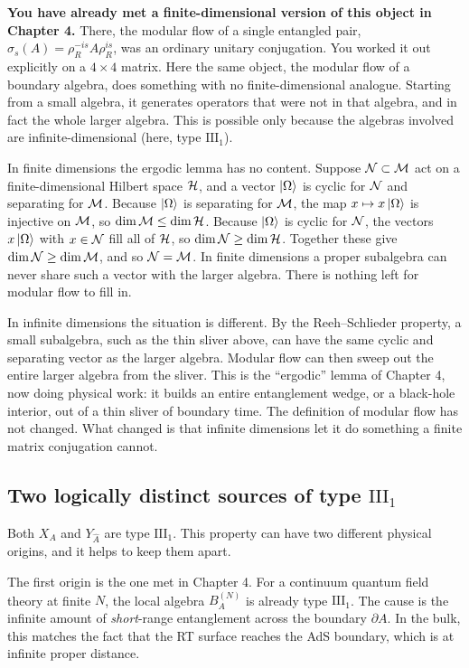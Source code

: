 \begin{physconnect}
\textbf{You have already met a finite-dimensional version of this object in Chapter 4.} There, the modular
flow of a single entangled pair, $\sigma_s(A)=\rho_R^{-is}A\rho_R^{is}$, was an ordinary unitary conjugation.
You worked it out explicitly on a $4\times4$ matrix. Here the same object, the modular flow of a boundary
algebra, does something with no finite-dimensional analogue. Starting from a small algebra, it generates
operators that were not in that algebra, and in fact the whole larger algebra. This is possible only because
the algebras involved are infinite-dimensional (here, type $\mathrm{III}_1$).

In finite dimensions the ergodic lemma has no content. Suppose $\mathcal{N}\subset\mathcal{M}$ act on a finite-dimensional
Hilbert space $\mathcal{H}$, and a vector $\ket\Omega$ is cyclic for $\mathcal{N}$ and separating for $\mathcal{M}$. Because
$\ket\Omega$ is separating for $\mathcal{M}$, the map $x\mapsto x\ket\Omega$ is injective on $\mathcal{M}$, so
$\dim\mathcal{M}\le\dim\mathcal{H}$. Because $\ket\Omega$ is cyclic for $\mathcal{N}$, the vectors $x\ket\Omega$ with $x\in\mathcal{N}$ fill all
of $\mathcal{H}$, so $\dim\mathcal{N}\ge\dim\mathcal{H}$. Together these give $\dim\mathcal{N}\ge\dim\mathcal{M}$, and so $\mathcal{N}=\mathcal{M}$. In finite dimensions
a proper subalgebra can never share such a vector with the larger algebra. There is nothing left for
modular flow to fill in.

In infinite dimensions the situation is different. By the Reeh--Schlieder property, a small subalgebra, such
as the thin sliver above, can have the same cyclic and separating vector as the larger algebra. Modular flow
can then sweep out the entire larger algebra from the sliver. This is the ``ergodic'' lemma of Chapter 4, now
doing physical work: it builds an entire entanglement wedge, or a black-hole interior, out of a thin sliver of
boundary time. The definition of modular flow has not changed. What changed is that infinite dimensions let it
do something a finite matrix conjugation cannot.
\end{physconnect}

\subsection*{Two logically distinct sources of type $\mathrm{III}_1$}

Both $X_A$ and $Y_{\widehat A}$ are type $\mathrm{III}_1$. This property can have two different physical
origins, and it helps to keep them apart.

The first origin is the one met in Chapter 4. For a continuum quantum field theory at finite $N$, the local
algebra $B_A^{(N)}$ is already type $\mathrm{III}_1$. The cause is the infinite amount of \emph{short}-range
entanglement across the boundary $\partial A$. In the bulk, this matches the fact that the RT surface reaches
the AdS boundary, which is at infinite proper distance.

